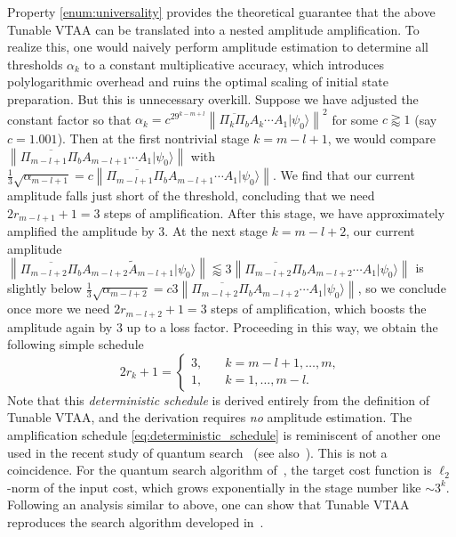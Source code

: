 \documentclass[letterpaper,onecolumn,11pt,accepted=2026-02-14]{quantumarticle}
\newcommand{\norm}[1]{\left\lVert#1\right\rVert}
\theoremstyle{remark}
\theoremstyle{plain}
\newcommand{\eq}[1]{\cref{eq:#1}}
\newcommand{\ket}[1]{|#1\rangle}
\begin{document}
Property \ref{enum:universality} provides the theoretical guarantee that the above Tunable VTAA can be translated into a nested amplitude amplification.
To realize this,
one would naively perform amplitude estimation to determine all thresholds $\alpha_k$ to a constant multiplicative accuracy, which introduces polylogarithmic overhead and ruins the optimal scaling of initial state preparation. But this is unnecessary overkill. Suppose we have adjusted the constant factor so that $\alpha_k=c^29^{k-m+l}\norm{\overline{\Pi_k\Pi_b}A_k\cdots A_1\ket{\psi_0}}^2$ for some $c\gtrapprox 1$ (say $c=1.001$).
Then at the first nontrivial stage $k=m-l+1$, we would compare $\norm{\overline{\Pi_{m-l+1}\Pi_b}A_{m-l+1}\cdots A_1\ket{\psi_0}}$ with $\frac{1}{3}\sqrt{\alpha_{m-l+1}}=c\norm{\overline{\Pi_{m-l+1}\Pi_b}A_{m-l+1}\cdots A_1\ket{\psi_0}}$. We find that our current amplitude falls just short of the threshold, concluding that we need $2r_{m-l+1}+1=3$ steps of amplification. After this stage, we have approximately amplified the amplitude by $3$. At the next stage $k=m-l+2$, our current amplitude $\norm{\overline{\Pi_{m-l+2}\Pi_b}A_{m-l+2}\widetilde A_{m-l+1}\ket{\psi_0}}\lessapprox3\norm{\overline{\Pi_{m-l+2}\Pi_b}A_{m-l+2}\cdots A_1\ket{\psi_0}}$ is slightly below $\frac{1}{3}\sqrt{\alpha_{m-l+2}}=c3\norm{\overline{\Pi_{m-l+2}\Pi_b}A_{m-l+2}\cdots A_1\ket{\psi_0}}$, so we conclude once more we need $2r_{m-l+2}+1=3$ steps of amplification, which boosts the amplitude again by $3$ up to a loss factor.
Proceeding in this way, we obtain the following simple schedule
\begin{equation}
\label{eq:deterministic_schedule}
    2r_k+1=
    \begin{cases}
        3,\quad &k=m-l+1,\ldots,m,\\
        1,&k=1,\ldots,m-l.
    \end{cases}
\end{equation}
Note that this \emph{deterministic schedule} is derived entirely from the definition of Tunable VTAA, and the derivation requires \emph{no} amplitude estimation.
The amplification schedule \eq{deterministic_schedule} is reminiscent of another one used in the recent study of quantum search~\cite{SimpleSearch23} (see also~\cite{BoundedErrorInputs,NestedSearch,chakraborty_et_al:LIPIcs.STACS.2022.20}). This is not a coincidence. For the quantum search algorithm of~\cite{SimpleSearch23}, the target cost function is $\ell_2$-norm of the input cost, which grows exponentially in the stage number like $\sim 3^k$. Following an analysis similar to above, one can show that Tunable VTAA reproduces the search algorithm developed in~\cite{SimpleSearch23}.
\end{document}
